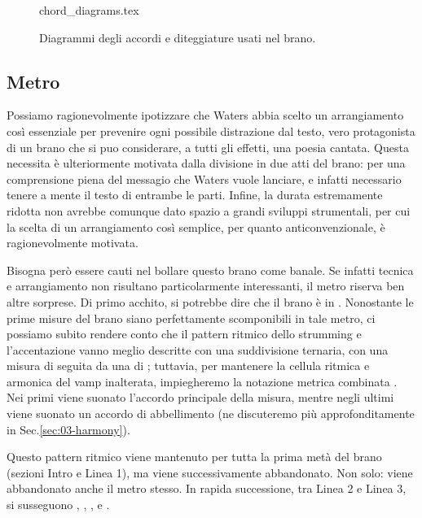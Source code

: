 \documentclass[class=book, crop=false, oneside, 12pt]{standalone}
\begin{document}
    \begin{figure}
        {chord_diagrams.tex}
        \caption{Diagrammi degli accordi e diteggiature usati nel brano.}
        \label{fig:03-chords}
    \end{figure}

    \subsection{Metro}
    Possiamo ragionevolmente ipotizzare che Waters abbia scelto un arrangiamento così essenziale per prevenire ogni possibile distrazione dal testo, vero protagonista di un brano che si puo considerare, a tutti gli effetti, una poesia cantata. Questa necessita è ulteriormente motivata dalla divisione in due atti del brano: per una comprensione piena del messagio che Waters vuole lanciare, e infatti necessario tenere a mente il testo di entrambe le parti. Infine, la durata estremamente ridotta non avrebbe comunque dato spazio a grandi sviluppi strumentali, per cui la scelta di un arrangiamento così semplice, per quanto anticonvenzionale, è ragionevolmente motivata. 

    Bisogna però essere cauti nel bollare questo brano come banale. Se infatti  tecnica e arrangiamento  non risultano particolarmente interessanti, il metro riserva ben altre sorprese. Di primo acchito, si potrebbe dire che il brano è in . Nonostante le prime misure del brano siano perfettamente scomponibili in tale metro, ci possiamo subito rendere conto che il pattern ritmico dello strumming e l'accentazione vanno meglio descritte con una suddivisione ternaria, con una misura di  seguita da una di ; tuttavia, per mantenere la cellula ritmica e armonica del vamp inalterata, impiegheremo la notazione metrica combinata   . Nei primi  viene suonato l'accordo principale della misura, mentre negli ultimi  viene suonato un accordo di abbellimento (ne discuteremo più approfonditamente in Sec.\ref{sec:03-harmony}). 
    
    \begin{sheet}[htbp]
        \centering
        \caption{Pattern ritmico dell'introduzione.}
        \label{sheet:potw-rhythm_intro}
    \end{sheet}

    Questo pattern ritmico viene mantenuto per tutta la prima metà del brano (sezioni Intro e Linea 1), ma viene successivamente abbandonato. Non solo: viene abbandonato anche il metro stesso. In rapida successione, tra Linea 2 e Linea 3, si susseguono , , ,  e .
\end{document}
